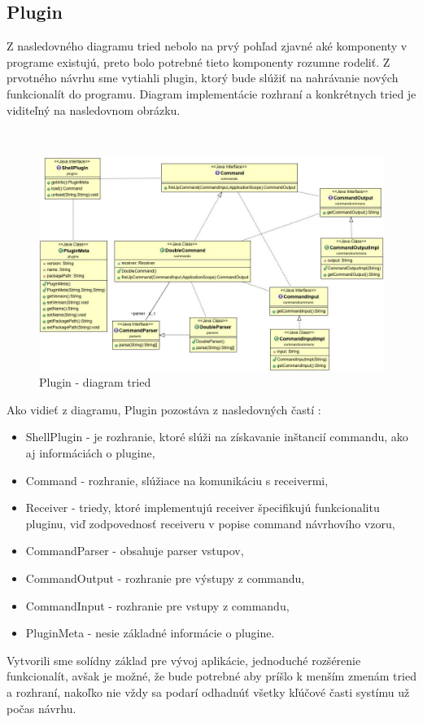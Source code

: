 {\subsection{Plugin}
\indent Z nasledovného diagramu tried nebolo na prvý pohľad zjavné aké komponenty v programe existujú, preto bolo potrebné tieto komponenty rozumne rodeliť. Z prvotného návrhu sme vytiahli plugin, ktorý bude slúžiť na nahrávanie nových funkcionalít do programu.  Diagram implementácie rozhraní a konkrétnych tried  je viditeľný na nasledovnom obrázku. 

 \begin{figure}[H]
	\centering
	\includegraphics[width=\linewidth]{img/plugin_class.jpg}
	\caption{Plugin - diagram tried}
	\label{fig:test}
\end{figure}

\indent Ako vidieť z diagramu, Plugin pozostáva z nasledovných častí :
\begin{itemize}
	\item ShellPlugin - je rozhranie, ktoré slúži na získavanie inštancií commandu, ako aj informáciách o plugine, 
	\item Command - rozhranie, slúžiace na komunikáciu s receivermi,
	\item Receiver - triedy, ktoré implementujú receiver špecifikujú funkcionalitu pluginu, viď zodpovednosť receiveru v popise command návrhovího vzoru,
	\item CommandParser - obsahuje parser vstupov,
	\item CommandOutput - rozhranie pre výstupy z commandu,
	\item CommandInput - rozhranie pre vstupy z commandu,
	\item  PluginMeta - nesie základné informácie o plugine.
\end{itemize}
Vytvorili sme solídny základ pre vývoj aplikácie, jednoduché rozšérenie funkcionalít, avšak je možné, že bude potrebné aby príšlo k menším zmenám tried a rozhraní, nakoľko nie vždy sa podarí odhadnúť  všetky kľúčové časti systímu už počas návrhu.

}
